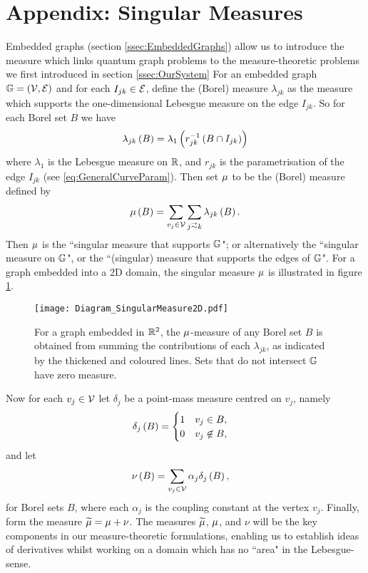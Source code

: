 \section{Appendix: Singular Measures} \label{app:SingularMeasures}
Embedded graphs (section \ref{ssec:EmbeddedGraphs}) allow us to introduce the measure which links quantum graph problems to the measure-theoretic problems we first introduced in section \ref{ssec:OurSystem}
For an embedded graph $\mathbb{G} = \left( \mathcal{V},\mathcal{E} \right)$ and for each $I_{jk}\in \mathcal{E}$, define the (Borel) measure $\lambda_{jk}$ as the measure which supports the one-dimensional Lebesgue measure on the edge $I_{jk}$.
So for each Borel set $B$ we have
\begin{align*}
	\lambda_{jk}\left( B \right) = \lambda_{1}\left( r_{jk}^{-1}\left( B \cap I_{jk} \right) \right)
\end{align*}
where $\lambda_1$ is the Lebesgue measure on $\mathbb{R}$, and $r_{jk}$ is the parametrisation of the edge $I_{jk}$ (see \eqref{eq:GeneralCurveParam}).
Then set $\mu$ to be the (Borel) measure defined by
\begin{align*}
	\ddmes\bracs{B} = \sum_{v_j\in \vertSet}\sum_{j\conLeft k} \lambda_{jk}\bracs{B}.
\end{align*}
Then $\mu$ is the ``singular measure that supports $\mathbb{G}$"; or alternatively the ``singular measure on $\mathbb{G}$", or the ``(singular) measure that supports the edges of $\mathbb{G}$". 
For a graph embedded into a 2D domain, the singular measure $\mu$ is illustrated in figure \ref{fig:Diagram_SingularMeasure2D}.
\begin{figure}[b!]
	\centering
	\texttt{[image: Diagram\_SingularMeasure2D.pdf]}
	\caption{\label{fig:Diagram_SingularMeasure2D} For a graph embedded in $\mathbb{R}^2$, the $\mu$-measure of any Borel set $B$ is obtained from summing the contributions of each $\lambda_{jk}$, as indicated by the thickened and coloured lines.
	Sets that do not intersect $\mathbb{G}$ have zero measure.}
\end{figure} \newline

Now for each $v_j\in\mathcal{V}$ let $\delta_j$ be a point-mass measure centred on $v_j$, namely
\begin{align*}
	\delta_j\left( B \right) &= \begin{cases} 1 & v_j\in B, \\ 0 & v_j\not\in B, \end{cases}
\end{align*}
and let
\begin{align*}
	\nu\left( B \right) &= \sum_{v_j\in\mathcal{V}}\alpha_j\delta_j\left( B \right),
\end{align*}
for Borel sets $B$, where each $\alpha_j$ is the coupling constant at the vertex $v_j$.
Finally, form the measure $\widetilde{\mu} = \mu + \nu$.
The measures $\widetilde{\mu}$, $\mu$, and $\nu$ will be the key components in our measure-theoretic formulations, enabling us to establish ideas of derivatives whilst working on a domain which has no ``area" in the Lebesgue-sense.

